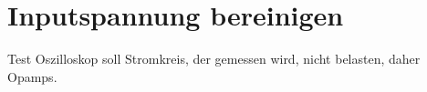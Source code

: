 \section{Inputspannung bereinigen}

Test \newline
Oszilloskop soll Stromkreis, der gemessen wird, nicht belasten, daher Opamps.
